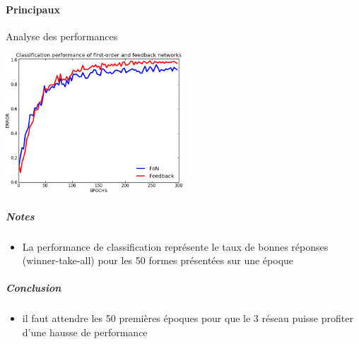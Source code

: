     \paragraph{Principaux}
      Analyse des performances
      \begin{center}
	\includegraphics[width=250px]{data/expF1/perff.png}
      \end{center}
      \subparagraph{Notes}
	\begin{itemize}
	  \item La performance de classification représente le taux de bonnes réponses (winner-take-all) pour les 50 formes présentées sur une époque
	\end{itemize}
      \subparagraph{Conclusion}
	\begin{itemize}
	  \item il faut attendre les 50 premières époques pour que le 3 réseau puisse profiter d'une hausse de performance
	\end{itemize}
